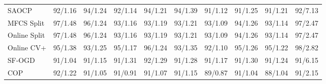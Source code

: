 \documentclass[11pt]{article}
\begin{document}
\begin{table}[h]
{\begin{tabular}{lrrrrrrrrr}
SAOCP & 92/1.16 & 94/1.24 & 92/1.14 & 94/1.21 & 94/1.39 & 91/1.12 & 91/1.25 & 91/1.21 & 92/7.13\\
MFCS Split & 97/1.48 & 96/1.24 & 93/1.16 & 93/1.19 & 93/1.21 & 93/1.09 & 94/1.26 & 93/1.14 & 97/2.47\\
Online Split & 97/1.48 & 96/1.24 & 93/1.16 & 93/1.19 & 93/1.21 & 93/1.09 & 94/1.26 & 93/1.14 & 97/2.47\\
Online CV+ & 95/1.38 & 93/1.25 & 95/1.17 & 96/1.24 & 93/1.35 & 92/1.10 & 95/1.26 & 95/1.22 & 98/2.82\\
SF-OGD & 91/1.04 & 91/1.15 & 91/1.31 & 92/1.29 & 91/1.28 & 91/1.17 & 91/1.30 & 91/1.24 & 91/6.15\\
COP & 92/1.22 & 91/1.05 & 91/0.91 & 91/1.07 & 91/1.15 & 89/0.87 & 91/1.04 & 88/1.04 & 91/2.15\\
\bottomrule\end{tabular}}\end{table}
\end{document}
